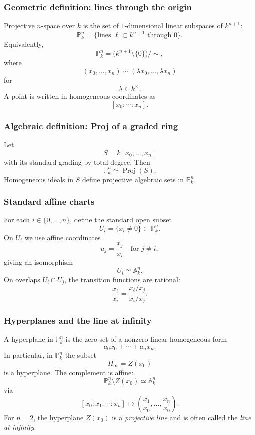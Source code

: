 \documentclass[12pt,a4paper]{article}
\theoremstyle{plain}
\theoremstyle{definition}      %
\begin{document}
\subsubsection*{Geometric definition: lines through the origin}

Projective \(n\)-space over \(k\) is the set of \(1\)-dimensional linear subspaces of \(k^{n+1}\):
\[
\mathbb P^n_k
=
\bigl\{
\text{lines } \ell \subset k^{n+1} \text{ through } 0
\bigr\}.
\]
Equivalently,
\[
\mathbb P^n_k
=
\bigl(k^{n+1}\setminus\{0\}\bigr)\big/\sim,
\]
where
\[
(x_0,\dots,x_n)\sim(\lambda x_0,\dots,\lambda x_n)
\]
for
\[
\lambda\in k^\times.
\]
A point is written in homogeneous coordinates as
\[
[x_0:\cdots:x_n].
\]

\subsubsection*{Algebraic definition: Proj of a graded ring}

Let
\[
S=k[x_0,\dots,x_n]
\]
with its standard grading by total degree.
Then
\[
\mathbb P^n_k \simeq \operatorname{Proj}(S).
\]
Homogeneous ideals in \(S\) define projective algebraic sets in \(\mathbb P^n_k\).

\subsubsection*{Standard affine charts}

For each \(i\in\{0,\dots,n\}\), define the standard open subset
\[
U_i=\{x_i\neq 0\}\subset \mathbb P^n_k.
\]
On \(U_i\) we use affine coordinates
\[
u_j=\frac{x_j}{x_i}
\quad\text{for } j\neq i,
\]
giving an isomorphism
\[
U_i \simeq \mathbb A^n_k.
\]
On overlaps \(U_i\cap U_j\), the transition functions are rational:
\[
\frac{x_\ell}{x_i}
=
\frac{x_\ell/x_j}{x_i/x_j}.
\]

\subsubsection*{Hyperplanes and the line at infinity}

A hyperplane in \(\mathbb P^n_k\) is the zero set of a nonzero linear homogeneous form
\[
a_0x_0+\cdots+a_nx_n.
\]
In particular, in \(\mathbb P^n_k\) the subset
\[
H_\infty = Z(x_0)
\]
is a hyperplane.
The complement is affine:
\[
\mathbb P^n_k\setminus Z(x_0)\simeq \mathbb A^n_k
\]
via
\[
[x_0:x_1:\cdots:x_n]\mapsto \left(\frac{x_1}{x_0},\dots,\frac{x_n}{x_0}\right).
\]
For \(n=2\), the hyperplane \(Z(x_0)\) is a \emph{projective line} and is often called the \emph{line at infinity}.
\end{document}
